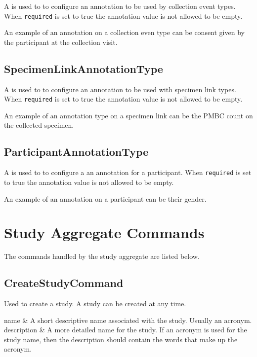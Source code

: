 A  is used to to configure an
annotation to be used by collection event types. When \texttt{required} is set
to true the annotation value is not allowed to be empty.

An example of an annotation on a collection even type can be consent given by
the participant at the collection visit.

\subsection*{SpecimenLinkAnnotationType}

A  is used to to configure an
annotation to be used with specimen link types. When \texttt{required} is set
to true the annotation value is not allowed to be empty.

An example of an annotation type on a specimen link can be the PMBC count on
the collected specimen.

\subsection*{ParticipantAnnotationType}

A  is used to to configure a an
annotation for a participant. When \texttt{required} is set to true the
annotation value is not allowed to be empty.

An example of an annotation on a participant can be their gender.

\section {Study Aggregate Commands}

The commands handled by the study aggregate are listed below.

\subsection*{CreateStudyCommand}

Used to create a study. A study can be created at any time.

\begin{commandparmtable}

  name & A short descriptive name associated with the study. Usually an acronym.\\

  description & A more detailed name for the study. If an acronym is used for
  the study name, then the description should contain the words that make up
  the acronym.\\

\end{commandparmtable}

